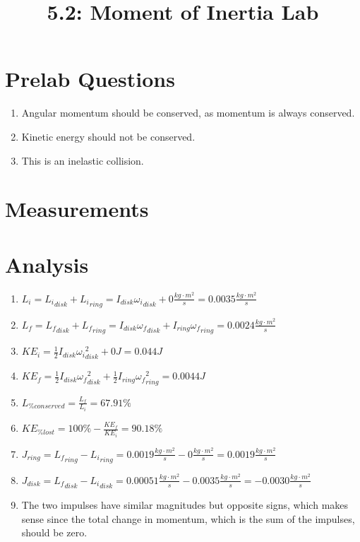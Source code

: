 \documentclass{article}
\title{5.2: Moment of Inertia Lab}
\begin{document}
\section{Prelab Questions}
\begin{enumerate}
    \item Angular momentum should be conserved, as momentum is always conserved.
    \item Kinetic energy should not be conserved.
    \item This is an inelastic collision.
\end{enumerate}
\section{Measurements}
\begin{center}
\end{center}
\section{Analysis}
\begin{enumerate}
    \item $L_i = {L_i}_{disk} + {L_i}_{ring}= I_{disk}{\omega_i}_{disk} + 0 \frac{kg \cdot m^2}{s} = 0.0035 \frac{kg \cdot m^2}{s}$
    \item $L_f = {L_f}_{disk} + {L_f}_{ring}= I_{disk}{\omega_f}_{disk} + I_{ring}{\omega_f}_{ring} = 0.0024 \frac{kg \cdot m^2}{s}$
    \item $KE_i = \frac{1}{2}I_{disk}{\omega_i}_{disk}^2 + 0 J = 0.044 J$
    \item $KE_f = \frac{1}{2}I_{disk}{\omega_f}_{disk}^2 + \frac{1}{2}I_{ring}{\omega_f}_{ring}^2 = 0.0044 J$
    \item $L_{\% conserved} = \frac{L_f}{L_i} = 67.91\%$
    \item $KE_{\% lost} = 100\% - \frac{KE_f}{KE_i} = 90.18\%$
    \item $J_{ring} = {L_f}_{ring} - {L_i}_{ring} = 0.0019 \frac{kg \cdot m^2}{s} - 0 \frac{kg \cdot m^2}{s} = 0.0019 \frac{kg \cdot m^2}{s}$
    \item $J_{disk} = {L_f}_{disk} - {L_i}_{disk} = 0.00051 \frac{kg \cdot m^2}{s} - 0.0035 \frac{kg \cdot m^2}{s} = -0.0030 \frac{kg \cdot m^2}{s}$
    \item The two impulses have similar magnitudes but opposite signs, which makes sense since the total change in momentum, which is the sum of the impulses, should be zero.
\end{enumerate}
\end{document}
